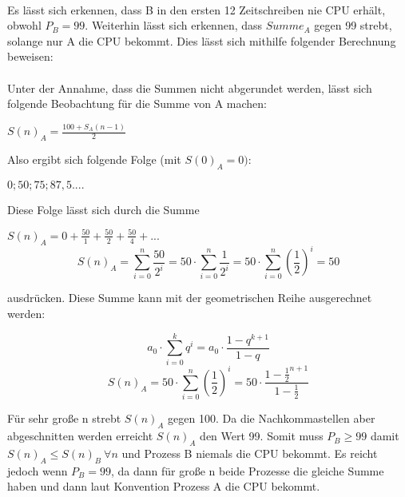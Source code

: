 \documentclass{ti2}
\begin{document}
\\Es lässt sich erkennen, dass B in den ersten 12 Zeitschreiben nie CPU erhält, obwohl $P_B = 99$. Weiterhin lässt sich erkennen, dass $Summe_A$ gegen 99 strebt, solange nur A die CPU bekommt. Dies lässt sich mithilfe folgender Berechnung beweisen: \\ \\ 
Unter der Annahme, dass die Summen nicht abgerundet werden, lässt sich folgende Beobachtung für die Summe von A machen: 
\begin{center}
$S(n)_A= \frac{100+S_A(n-1)}{2} $ 
\end{center}
Also ergibt sich folgende Folge (mit $S(0)_A = 0)$: 
\begin{center}
$0; 50; 75; 87,5 ....$ 
\end{center}
Diese Folge lässt sich durch die Summe 
\begin{center}
$S(n)_A = 0+\frac{50}{1} + \frac{50}{2} + \frac{50}{4} + ...$\\
\[S(n)_A = \sum_{i=0}^n \frac{50}{2^i} = 50 \cdot \sum_{i=0}^n \frac{1}{2^i}   = 50 \cdot \sum_{i=0}^n (\frac{1}{2})^i = 50\] 
\end{center}
ausdrücken. Diese Summe kann mit der geometrischen Reihe ausgerechnet werden:
\begin{center}
\[ a_0 \cdot \sum_{i=0}^{k} q^i = a_0 \cdot \frac{1-q^{k+1}}{1-q}\] 
\[S(n)_A = 50 \cdot \sum_{i=0}^{n} (\frac{1}{2})^i = 50\cdot  \frac{1-\frac{1}{2}^{n+1}}{1-\frac{1}{2}}\] 
\end{center}
Für sehr große n strebt $S(n)_A$ gegen 100. Da die Nachkommastellen aber abgeschnitten werden erreicht $S(n)_A$ den Wert 99. 
Somit muss $P_B \geq 99$ damit $S(n)_A \leq S(n)_B\  \forall n$ und Prozess B niemals die CPU bekommt. Es reicht jedoch wenn $P_B = 99$, da dann für große n beide Prozesse die gleiche Summe haben und dann laut Konvention Prozess A die CPU bekommt. 
\end{document}
